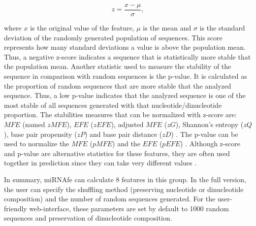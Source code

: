 \documentclass{article}
\begin{document}
\begin{equation}
 z = \frac{x-\mu}{\sigma},
\end{equation}

\noindent where $x$ is the original value of the feature, $\mu$ is the mean and $\sigma$ is the standard deviation of the randomly generated population of
sequences. This score represents how many standard deviations a value is above the population mean. Thus, a negative z-score indicates a sequence that is
statistically more stable that the population mean. Another statistic used to measure the stability of the sequence in comparison with random sequences is the
p-value. It is calculated as the proportion of random sequences that are more stable that the analyzed sequence. Thus, a low p-value indicates that the
analyzed sequence is one of the most stable of all sequences generated with that nucleotide/dinucleotide proportion. The stabilities measures that can be
normalized with z-score are: $MFE$ (named $zMFE$), $EFE$ ($zEFE$), adjusted $MFE$ ($zG$), Shannon's entropy ($zQ$), base pair propensity ($zP$) \citep{Ng07}
and base pair distance ($zD$) \citep{Jiandong10}. The p-value can be used to normalize the $MFE$ ($pMFE$) \citep{Bonnet04} and the $EFE$ ($pEFE$)
\citep{Jiandong10}. Although z-score and p-value are alternative statistics for these features, they are often used together in prediction since they can take
very different values \citep{Jiandong10}.

In summary, miRNAfe can calculate 8 features in this group. In the full version, the user can specify the shuffling method (preserving nucleotide or
dinucleotide composition) and the number of random sequences generated. For the user-friendly web-interface, these parameters are set by default to 1000 random
sequences and preservation of dinucleotide composition.
\end{document}
